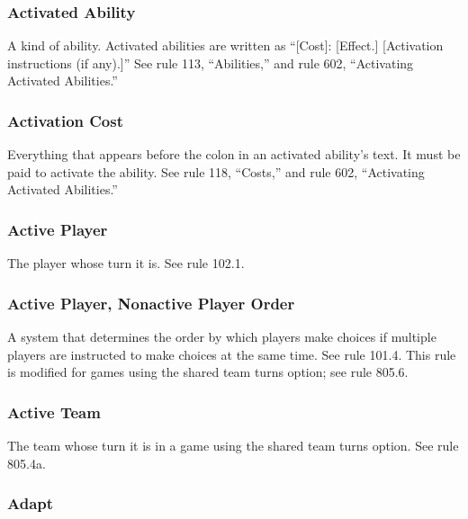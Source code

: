 \subsubsection*{Activated Ability}

A kind of ability. Activated abilities are written as “[Cost]: [Effect.] [Activation instructions (if any).]” See rule 113, “Abilities,” and rule 602, “Activating Activated Abilities.”

\subsubsection*{Activation Cost}

Everything that appears before the colon in an activated ability’s text. It must be paid to activate the ability. See rule 118, “Costs,” and rule 602, “Activating Activated Abilities.”

\subsubsection*{Active Player}

The player whose turn it is. See rule 102.1.

\subsubsection*{Active Player, Nonactive Player Order}

A system that determines the order by which players make choices if multiple players are instructed to make choices at the same time. See rule 101.4. This rule is modified for games using the shared team turns option; see rule 805.6.

\subsubsection*{Active Team}

The team whose turn it is in a game using the shared team turns option. See rule 805.4a.

\subsubsection*{Adapt}


